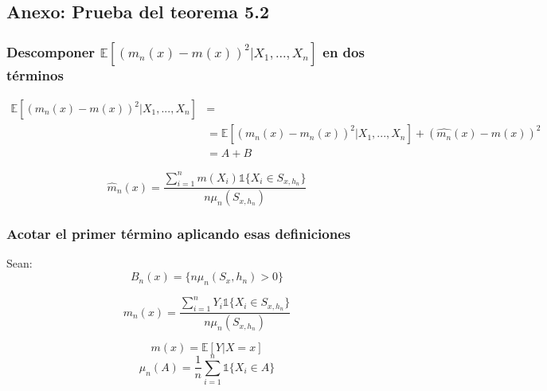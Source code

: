 \documentclass[12pt, a4paper]{article}
\begin{document}
\subsection{Anexo: Prueba del teorema 5.2}
\subsubsection{Descomponer $ \mathds{E}[ (m_n(x) - m(x))^2 | X_1, ..., X_n] $ en dos términos}

$$
\begin{aligned}
\mathds{E}[ (m_n(x) - m(x))^2 | X_1, ..., X_n ] &= \\
&= \mathds{E}[ (m_n(x) - \hat{m_n}(x))^2 | X_1, ..., X_n ] + (\hat{m_n}(x) - m(x))^2 \\ 
&= A + B
\end{aligned}
$$

$$
\hat{m}_n(x) = \frac{ \sum_{i=1}^{n} m(X_i) \mathds{1}\{ X_i \in S_{x,h_n} \} }{n \mu_n(S_{x,h_n})}
$$

\subsubsection{Acotar el primer término aplicando esas definiciones}

Sean:
$$
B_n(x)=\{ n \mu_n(S_x,h_n) > 0 \}
$$

$$
m_n(x)=\frac{ \sum_{i=1}^{n} Y_i \mathds{1}\{ X_i \in S_{x,h_n} \} }{n \mu_n(S_{x,h_n})}
$$

$$
m(x)=\mathds{E}[Y|X=x]
$$
$$
\mu_n(A)=\frac{1}{n}\sum_{i=1}^n \mathds{1}\{ X_i \in A \}
$$
\end{document}
